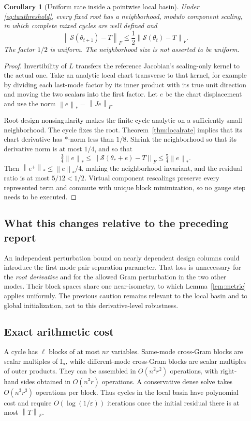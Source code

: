 \documentclass[11pt]{article}
\newtheorem{corollary}[theorem]{Corollary}
\theoremstyle{remark}\newtheorem{remark}[theorem]{Remark}
\newcommand{\norm}[1]{\left\lVert#1\right\rVert}
\newcommand{\Id}{\mathrm I}
\newcommand{\Smap}{\mathcal S}
\begin{document}
\begin{corollary}[Uniform rate inside a pointwise local basin]\label{cor:nonlinear}
Under \eqref{eq:tauthreshold}, every fixed root has a neighborhood, modulo component scaling, in which complete mixed cycles are well defined and
\begin{equation}\label{eq:half}
 \norm{\Smap(\theta_{t+1})-T}_F
 \le\frac12\norm{\Smap(\theta_t)-T}_F.
\end{equation}
The factor $1/2$ is uniform. The neighborhood size is not asserted to be uniform.
\end{corollary}
\begin{proof}
Invertibility of $L$ transfers the reference Jacobian's scaling-only kernel to the actual one. Take an analytic local chart transverse to that kernel, for example by dividing each last-mode factor by its inner product with its true unit direction and moving the two scalars into the first factor. Let $e$ be the chart displacement and use the norm $\norm{e}_*=\norm{Je}_F$.

Root design nonsingularity makes the finite cycle analytic on a sufficiently small neighborhood. The cycle fixes the root. Theorem~\ref{thm:localrate} implies that its chart derivative has $*$-norm less than $1/8$. Shrink the neighborhood so that its derivative norm is at most $1/4$, and so that
\[
 \tfrac34\norm{e}_*\le\norm{\Smap(\theta_*+e)-T}_F
 \le\tfrac54\norm{e}_*.
\]
Then $\norm{e^+}_*\le\norm{e}_*/4$, making the neighborhood invariant, and the residual ratio is at most $5/12<1/2$. Virtual component rescalings preserve every represented term and commute with unique block minimization, so no gauge step needs to be executed.
\end{proof}

\subsection{What this changes relative to the preceding report}
An independent perturbation bound on nearly dependent design columns could introduce the first-mode pair-separation parameter. That loss is unnecessary for the \emph{root derivative} and for the allowed Gram perturbation in the two other modes. Their block spaces share one near-isometry, to which Lemma~\ref{lem:metric} applies uniformly. The previous caution remains relevant to the local basin and to global initialization, not to this derivative-level robustness.

\subsection{Exact arithmetic cost}
A cycle has $\ell$ blocks of at most $nr$ variables. Same-mode cross-Gram blocks are scalar multiples of $\Id_n$, while different-mode cross-Gram blocks are scalar multiples of outer products. They can be assembled in $O(n^2r^2)$ operations, with right-hand sides obtained in $O(n^3r)$ operations. A conservative dense solve takes $O(n^3r^3)$ operations per block. Thus cycles in the local basin have polynomial cost and require $O(\log(1/\varepsilon))$ iterations once the initial residual there is at most $\norm{T}_F$.
\end{document}
